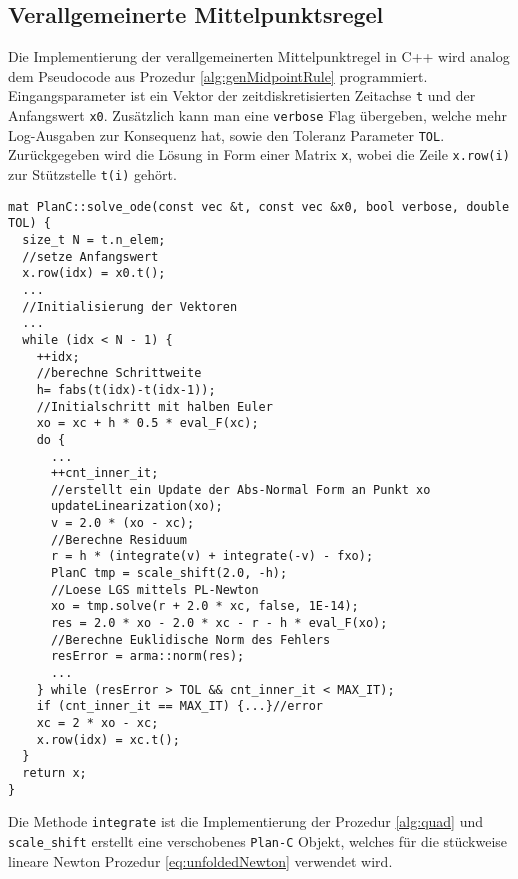 \subsection{Verallgemeinerte Mittelpunktsregel}
Die Implementierung der verallgemeinerten Mittelpunktregel in C++ wird analog dem Pseudocode aus Prozedur \ref{alg:genMidpointRule} programmiert. Eingangsparameter ist ein Vektor der zeitdiskretisierten Zeitachse \texttt{t} und der Anfangswert \texttt{x0}. Zusätzlich kann man eine \texttt{verbose} Flag übergeben, welche mehr Log-Ausgaben zur Konsequenz hat, sowie den Toleranz Parameter \texttt{TOL}. Zurückgegeben wird die Lösung in Form einer Matrix \texttt{x}, wobei die Zeile \texttt{x.row(i)} zur Stützstelle \texttt{t(i)} gehört.
\begin{lstlisting}[caption=Verallgemeinerte Mittelpunktsregel,label=lst:genMidpointRule]
 mat PlanC::solve_ode(const vec &t, const vec &x0, bool verbose, double TOL) {
  size_t N = t.n_elem;
  //setze Anfangswert
  x.row(idx) = x0.t();
  ...
  //Initialisierung der Vektoren
  ...	
  while (idx < N - 1) {
    ++idx;
    //berechne Schrittweite
    h= fabs(t(idx)-t(idx-1));
    //Initialschritt mit halben Euler
    xo = xc + h * 0.5 * eval_F(xc);		
    do {
      ... 
      ++cnt_inner_it;
      //erstellt ein Update der Abs-Normal Form an Punkt xo
      updateLinearization(xo);
      v = 2.0 * (xo - xc);
      //Berechne Residuum
      r = h * (integrate(v) + integrate(-v) - fxo);
      PlanC tmp = scale_shift(2.0, -h);
      //Loese LGS mittels PL-Newton
      xo = tmp.solve(r + 2.0 * xc, false, 1E-14);
      res = 2.0 * xo - 2.0 * xc - r - h * eval_F(xo);
      //Berechne Euklidische Norm des Fehlers
      resError = arma::norm(res);
      ...
    } while (resError > TOL && cnt_inner_it < MAX_IT);
    if (cnt_inner_it == MAX_IT) {...}//error
    xc = 2 * xo - xc;    
    x.row(idx) = xc.t();
  }
  return x;
}
\end{lstlisting}
Die Methode \texttt{integrate} ist die Implementierung der Prozedur \ref{alg:quad} und \texttt{scale\_shift} erstellt eine verschobenes \texttt{Plan-C} Objekt, welches für die stückweise lineare Newton Prozedur \ref{eq:unfoldedNewton} verwendet wird.
